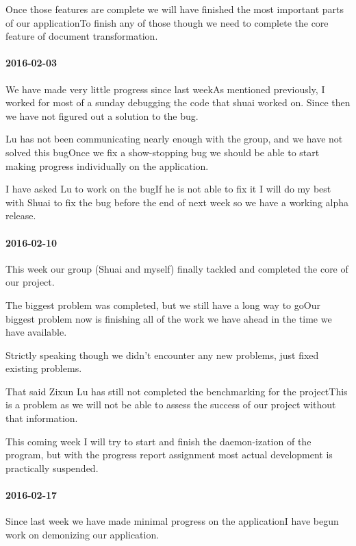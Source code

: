 Once those features are complete we will have finished the most important parts of our applicationTo finish any of those though we need to complete the core feature of document transformation.

\paragraph{2016-02-03}

We have made very little progress since last weekAs mentioned previously, I worked for most of a sunday debugging the code that shuai worked on.
Since then we have not figured out a solution to the bug.

Lu has not been communicating nearly enough with the group, and we have not solved this bugOnce we fix a show-stopping bug we should be able to start making progress individually on the application.

I have asked Lu to work on the bugIf he is not able to fix it I will do my best with Shuai to fix the bug before the end of next week so we have a working alpha release.

\paragraph{2016-02-10}

This week our group (Shuai and myself) finally tackled and completed the core of our project.

The biggest problem was completed, but we still have a long way to goOur biggest problem now is finishing all of the work we have ahead in the time we have available.

Strictly speaking though we didn't encounter any new problems, just fixed existing problems.

That said Zixun Lu has still not completed the benchmarking for the projectThis is a problem as we will not be able to assess the success of our project without that information.

This coming week I will try to start and finish the daemon-ization of the program, but with the progress report assignment most actual development is practically suspended.

\paragraph{2016-02-17}

Since last week we have made minimal progress on the applicationI have begun work on demonizing our application.

